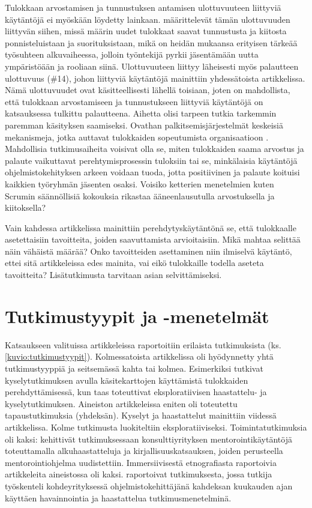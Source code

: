 \documentclass[utf8]{gradu3}
\begin{document}
Tulokkaan arvostamisen ja tunnustuksen antamisen ulottuvuuteen liittyviä käytäntöjä ei myöskään löydetty lainkaan. \textcite{wanberg-2012} määrittelevät tämän ulottuvuuden liittyvän siihen, missä määrin uudet tulokkaat saavat tunnustusta ja kiitosta ponnisteluistaan ja suorituksistaan, mikä on heidän mukaansa erityisen tärkeää työsuhteen alkuvaiheessa, jolloin työntekijä pyrkii jäsentämään uutta ympäristöään ja rooliaan siinä. Ulottuvuuteen liittyy läheisesti myös palautteen ulottuvuus (\#14), johon liittyviä käytäntöjä mainittiin yhdessätoista artikkelissa. Nämä ulottuvuudet ovat käsitteellisesti lähellä toisiaan, joten on mahdollista, että tulokkaan arvostamiseen ja tunnustukseen liittyviä käytäntöjä on katsauksessa tulkittu palautteena. Aihetta olisi tarpeen tutkia tarkemmin paremman käsityksen saamiseksi. Ovathan palkitsemisjärjestelmät keskeisiä mekanismeja, jotka auttavat tulokkaiden sopeutumista organisaatioon \parencite{jokisaari-nurmi-2009}. Mahdollisia tutkimusaiheita voisivat olla se, miten tulokkaiden saama arvostus ja palaute vaikuttavat perehtymisprosessin tuloksiin tai se, minkälaisia käytäntöjä ohjelmistokehityksen arkeen voidaan tuoda, jotta positiivinen ja palaute koituisi kaikkien työryhmän jäsenten osaksi. Voisiko ketterien menetelmien kuten Scrumin säännöllisiä kokouksia rikastaa ääneenlausutulla arvostuksella ja kiitoksella?

Vain kahdessa artikkelissa mainittiin perehdytyskäytäntönä se, että tulokkaalle asetettaisiin tavoitteita, joiden saavuttamista arvioitaisiin. Mikä mahtaa selittää näin vähäistä määrää? Onko tavoitteiden asettaminen niin ilmiselvä käytäntö, ettei sitä artikkeleissa edes mainita, vai eikö tulokkaille todella aseteta tavoitteita? Lisätutkimusta tarvitaan asian selvittämiseksi.

\section{Tutkimustyypit ja -menetelmät}
\label{luku-tutkimustyypit-ja-menetelmat}

Katsaukseen valituissa artikkeleissa raportoitiin erilaista tutkimuksista (ks. \ref{kuvio:tutkimustyypit}). Kolmessatoista artikkelissa oli hyödynnetty yhtä tutkimustyyppiä ja seitsemässä kahta tai kolmea. Esimerkiksi \textcite{azanza-ym-2021} tutkivat kyselytutkimuksen avulla käsitekarttojen käyttämistä tulokkaiden perehdyttämisessä, kun taas \textcite{pham-ym-2017} toteuttivat eksploratiivisen haastattelu- ja kyselytutkimuksen. Aineiston artikkeleissa eniten oli toteutettu tapaustutkimuksia (yhdeksän). Kyselyt ja haastattelut mainittiin viidessä artikkelissa. Kolme tutkimusta luokiteltiin eksploratiiviseksi. Toimintatutkimuksia oli kaksi: \textcite{bjornson-dingsøyr-2005} kehittivät tutkimuksessaan konsulttiyrityksen mentorointikäytäntöjä toteuttamalla alkuhaastatteluja ja kirjallisuuskatsauksen, joiden perusteella mentorointiohjelma uudistettiin. Immersiivisestä etnografiasta raportoivia artikkeleita aineistossa oli kaksi. \textcite{kumar-ym-2016} raportoivat tutkimuksesta, jossa tutkija työskenteli kohdeyrityksessä ohjelmistokehittäjänä kahdeksan kuukauden ajan käyttäen havainnointia ja haastattelua tutkimusmenetelminä.
\end{document}
